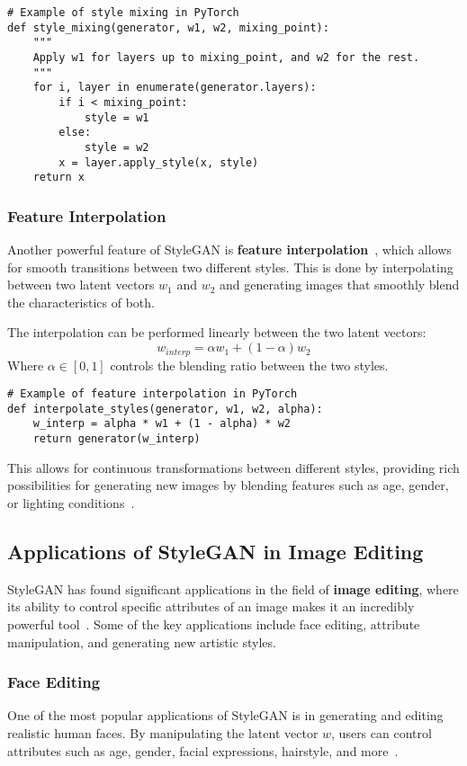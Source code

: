 \begin{lstlisting}[style=python]
# Example of style mixing in PyTorch
def style_mixing(generator, w1, w2, mixing_point):
    """
    Apply w1 for layers up to mixing_point, and w2 for the rest.
    """
    for i, layer in enumerate(generator.layers):
        if i < mixing_point:
            style = w1
        else:
            style = w2
        x = layer.apply_style(x, style)
    return x
\end{lstlisting}

\subsubsection{Feature Interpolation}
Another powerful feature of StyleGAN is \textbf{feature interpolation}~\cite{upchurch2017deep}, which allows for smooth transitions between two different styles. This is done by interpolating between two latent vectors \( w_1 \) and \( w_2 \) and generating images that smoothly blend the characteristics of both.

The interpolation can be performed linearly between the two latent vectors:
\[
w_{interp} = \alpha w_1 + (1 - \alpha) w_2
\]
Where \( \alpha \in [0, 1] \) controls the blending ratio between the two styles.

\begin{lstlisting}[style=python]
# Example of feature interpolation in PyTorch
def interpolate_styles(generator, w1, w2, alpha):
    w_interp = alpha * w1 + (1 - alpha) * w2
    return generator(w_interp)
\end{lstlisting}

This allows for continuous transformations between different styles, providing rich possibilities for generating new images by blending features such as age, gender, or lighting conditions~\cite{karras2020analyzing}.

\subsection{Applications of StyleGAN in Image Editing}

StyleGAN has found significant applications in the field of \textbf{image editing}, where its ability to control specific attributes of an image makes it an incredibly powerful tool~\cite{bermano2022state}. Some of the key applications include face editing, attribute manipulation, and generating new artistic styles.

\subsubsection{Face Editing}
One of the most popular applications of StyleGAN is in generating and editing realistic human faces. By manipulating the latent vector \( w \), users can control attributes such as age, gender, facial expressions, hairstyle, and more~\cite{alaluf2022hyperstyle}.

